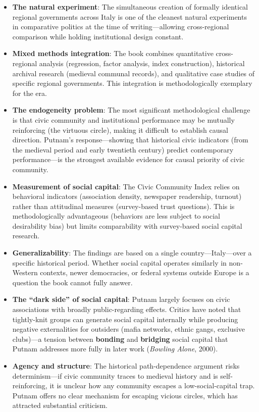 \documentclass[12pt]{article}
\begin{document}
\begin{itemize}[leftmargin=*, itemsep=4pt]
    \item \textbf{The natural experiment}: The simultaneous creation of formally identical regional governments across Italy is one of the cleanest natural experiments in comparative politics at the time of writing---allowing cross-regional comparison while holding institutional design constant.
    \item \textbf{Mixed methods integration}: The book combines quantitative cross-regional analysis (regression, factor analysis, index construction), historical archival research (medieval communal records), and qualitative case studies of specific regional governments. This integration is methodologically exemplary for the era.
    \item \textbf{The endogeneity problem}: The most significant methodological challenge is that civic community and institutional performance may be mutually reinforcing (the virtuous circle), making it difficult to establish causal direction. Putnam's response---showing that historical civic indicators (from the medieval period and early twentieth century) predict contemporary performance---is the strongest available evidence for causal priority of civic community.
    \item \textbf{Measurement of social capital}: The Civic Community Index relies on behavioral indicators (association density, newspaper readership, turnout) rather than attitudinal measures (survey-based trust questions). This is methodologically advantageous (behaviors are less subject to social desirability bias) but limits comparability with survey-based social capital research.
    \item \textbf{Generalizability}: The findings are based on a single country---Italy---over a specific historical period. Whether social capital operates similarly in non-Western contexts, newer democracies, or federal systems outside Europe is a question the book cannot fully answer.
    \item \textbf{The ``dark side'' of social capital}: Putnam largely focuses on civic associations with broadly public-regarding effects. Critics have noted that tightly-knit groups can generate social capital internally while producing negative externalities for outsiders (mafia networks, ethnic gangs, exclusive clubs)---a tension between \textbf{bonding} and \textbf{bridging} social capital that Putnam addresses more fully in later work (\textit{Bowling Alone}, 2000).
    \item \textbf{Agency and structure}: The historical path-dependence argument risks determinism---if civic community traces to medieval history and is self-reinforcing, it is unclear how any community escapes a low-social-capital trap. Putnam offers no clear mechanism for escaping vicious circles, which has attracted substantial criticism.
\end{itemize}
\end{document}
